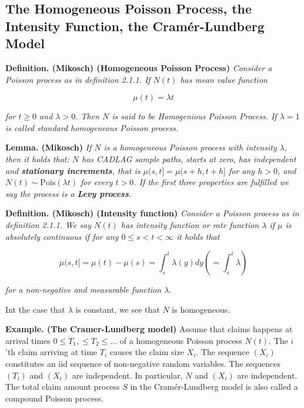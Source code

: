 \documentclass[a4paper,12pt,openany]{book}
\begin{document}
\hypertarget{the-homogeneous-poisson-process-the-intensity-function-the-cramuxe9r-lundberg-model}{%
\subsection{The Homogeneous Poisson Process, the Intensity Function, the Cramér-Lundberg Model}\label{the-homogeneous-poisson-process-the-intensity-function-the-cramuxe9r-lundberg-model}}

\textbf{Definition. (Mikosch) (Homogeneous Poisson Process)} \emph{Consider a Poisson process as in definition 2.1.1. If \(N(t)\) has mean value function}

\[
\mu(t)=\lambda t
\]

\emph{for \(t\ge 0\) and \(\lambda >0\). Then \(N\) is said to be Homogenious Poisson Process. If \(\lambda=1\) is called standard homogeneous Poisson process.}

\textbf{Lemma. (Mikosch)} \emph{If \(N\) is a homogeneous Poisson process with intensity \(\lambda\), then it holds that: \(N\) has CADLAG sample paths, starts at zero, has independent and \textbf{stationary increments}, that is \(\mu(s,t]=\mu(s+h,t+h]\) for any \(h>0\), and \(N(t)\sim \text{Pois}(\lambda t)\) for every \(t>0\). If the first three properties are fulfilled we say the process is a \textbf{Levy process}.}

\textbf{Definition. (Mikosch) (Intensity function)} \emph{Consider a Poisson process as in definition 2.1.1. We say \(N(t)\) has intensity function or rate function \(\lambda\) if \(\mu\) is absolutely continuous if for any \(0\le s <t<\infty\) it holds that}

\[
\mu(s,t]=\mu(t)-\mu(s)=\int^t_s\lambda(y) dy\left(=\int_s^t \lambda\right)
\]

\emph{for a non-negative and measurable function \(\lambda\).}

Int the case that \(\lambda\) is constant, we see that \(N\) is homogeneous.

\textbf{Example. (The Cramer-Lundberg model)} Assume that claims happens at arrival times \(0\le T_1,\le T_2\le ...\) of a homogeneous Poisson process \(N(t)\). The \(i\)'th claim arriving at time \(T_i\) causes the claim size \(X_i\). The sequence \((X_i)\) constitutes an iid sequence of non-negative random variables. The sequences \((T_i)\) and \((X_i)\) are independent. In particular, \(N\) and \((X_i)\) are independent. The total claim amount process \(S\) in the Cramér-Lundberg model is also called a compound Poisson process.
\end{document}
